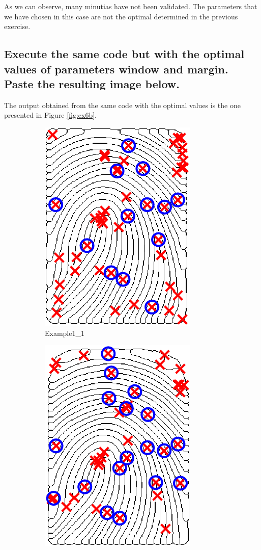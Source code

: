 \documentclass[a4paper]{article}
\begin{document}
As we can observe, many minutias have not been validated. The parameters that we have chosen in this case are not the optimal determined in the previous exercise.


\subsection{ Execute the same code but with the optimal values of parameters window and margin. Paste the resulting image below. }

The output obtained from the same code with the optimal values is the one presented in Figure \ref{fig:ex6b}.

\begin{figure}[H]
  \centering
       \begin{subfigure}[t]{0.45\textwidth}
         \centering
         \includegraphics[scale=0.7]{Figures/Validation1-3-13}
         \caption{Example1\_1}
     \end{subfigure}%
     \quad
     \begin{subfigure}[t]{0.45\textwidth}
         \centering
         \includegraphics[scale=0.7]{Figures/Validation2-3-13}

\end{subfigure}
\end{figure}
\end{document}
